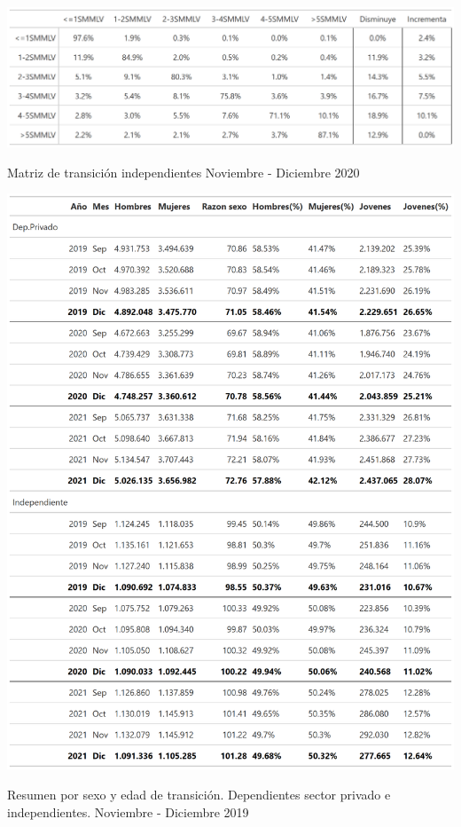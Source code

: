 \begin{table}[!h]
\centering
\includegraphics[width = 15cm]{results/02_longitudinal/salida_matriz_transicion_independientes_20.png}
\caption{Matriz de transición independientes Noviembre - Diciembre 2020}%
\label{tabla:independientes:matriz_transicion_mes_interes_20}
\end{table}



\begin{table}[!h]
\centering
\includegraphics[width = 15cm]{results/02_longitudinal/salida_resumen_demog_dependientes_independientes_21.png}
\caption{Resumen por sexo y edad de transición. Dependientes sector privado e independientes. Noviembre - Diciembre 2019}%
\label{tabla:sector_privado:demograficos}
\end{table}


